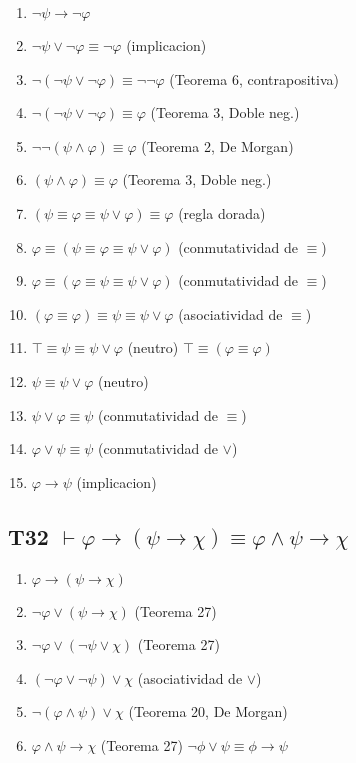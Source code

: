 \begin{enumerate}
    \item $\neg\psi \rightarrow \neg\varphi$
    \item $\neg\psi \lor \neg\varphi \equiv \neg\varphi$ \hfill (implicacion)
    \item $\neg(\neg\psi \lor \neg\varphi) \equiv \neg\neg\varphi$ \hfill (Teorema 6, contrapositiva)
    \item $\neg(\neg\psi \lor \neg\varphi) \equiv \varphi$ \hfill (Teorema 3, Doble neg.)
    \item $\neg\neg(\psi \land \varphi) \equiv \varphi$ \hfill (Teorema 2, De Morgan)
    \item $(\psi \land \varphi) \equiv \varphi$ \hfill (Teorema 3, Doble neg.)
    \item $(\psi \equiv \varphi \equiv \psi \lor \varphi) \equiv \varphi$ \hfill (regla dorada)
    \item $\varphi \equiv (\psi \equiv \varphi \equiv \psi \lor \varphi)$ \hfill (conmutatividad de $\equiv$)
    \item $\varphi \equiv (\varphi \equiv \psi \equiv \psi \lor \varphi)$ \hfill (conmutatividad de $\equiv$)
    \item $(\varphi \equiv \varphi) \equiv \psi \equiv \psi \lor \varphi$ \hfill (asociatividad de $\equiv$)
    \item $\top \equiv \psi \equiv \psi \lor \varphi$ \hfill (neutro) $\top \equiv (\varphi \equiv \varphi)$
    \item $\psi \equiv \psi \lor \varphi$ \hfill (neutro)
    \item $\psi \lor \varphi \equiv \psi$ \hfill (conmutatividad de $\equiv$)
    \item $\varphi \lor \psi \equiv \psi$ \hfill (conmutatividad de $\lor$)
    \item $\varphi \rightarrow \psi$ \hfill (implicacion)
\end{enumerate}

\subsection{T32 $\vdash \varphi \rightarrow (\psi \rightarrow \chi) \equiv \varphi \land \psi \rightarrow \chi$}

\begin{enumerate}
    \item $\varphi \rightarrow (\psi \rightarrow \chi)$
    \item $\neg\varphi \lor (\psi \rightarrow \chi)$ \hfill (Teorema 27)
    \item $\neg\varphi \lor (\neg\psi \lor \chi)$ \hfill (Teorema 27)
    \item $(\neg\varphi \lor \neg\psi) \lor \chi$ \hfill (asociatividad de $\lor$)
    \item $\neg(\varphi \land \psi) \lor \chi$ \hfill (Teorema 20, De Morgan)
    \item $\varphi \land \psi \rightarrow \chi$ \hfill (Teorema 27) $\neg\phi \lor \psi \equiv \phi \rightarrow \psi$
\end{enumerate}

